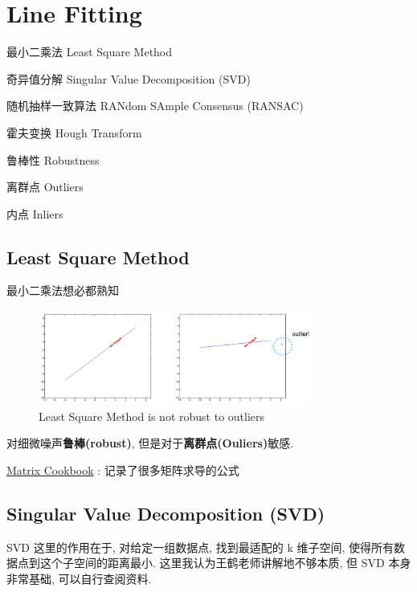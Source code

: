 \chapter{Line Fitting}

\begin{introduction}[Keywords]
    \item 最小二乘法 Least Square Method
    \item 奇异值分解 Singular Value Decomposition (SVD)
    \item 随机抽样一致算法 RANdom SAmple Consensus (RANSAC)
    \item 霍夫变换 Hough Transform
    \item 鲁棒性 Robustness
    \item 离群点 Outliers
    \item 内点 Inliers
\end{introduction}

\section{Least Square Method}

最小二乘法想必都熟知

\begin{figure}[htbp]
    \centering
    \includegraphics[width=0.8\textwidth]{figures/not_roboust_outliner.png}
    \caption{Least Square Method is not robust to outliers}
\end{figure}

对细微噪声\textbf{鲁棒(robust)}, 但是对于\textbf{离群点(Ouliers)}敏感.

\href{http://faculty.bicmr.pku.edu.cn/~wenzw/bigdata/matrix-cook-book.pdf}{Matrix Cookbook} : 记录了很多矩阵求导的公式

\section{Singular Value Decomposition (SVD)}

SVD 这里的作用在于, 对给定一组数据点, 找到最适配的 k 维子空间, 使得所有数据点到这个子空间的距离最小. 这里我认为王鹤老师讲解地不够本质, 但 SVD 本身非常基础, 可以自行查阅资料.

